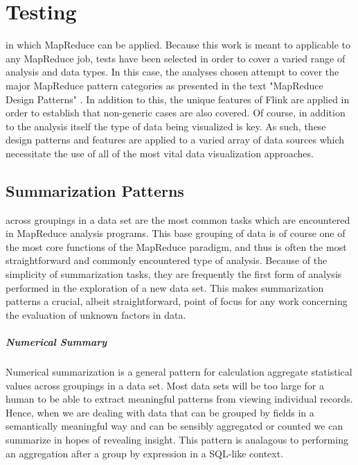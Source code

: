 \chapter{Testing}
\label{sec:testing}
 in which MapReduce can be applied. Because this work is meant to applicable to any MapReduce job, tests have been selected in order to cover a varied range of analysis and data types. In this case, the analyses chosen attempt to cover the major MapReduce pattern categories as presented in the text "MapReduce Design Patterns" \cite{Miner2012}. In addition to this, the unique features of Flink are applied in order to establish that non-generic cases are also covered. Of course, in addition to the analysis itself the type of data being visualized is key. As such, these design patterns and features are applied to a varied array of data sources which necessitate the use of all of the most vital data visualization approaches.

\section{Summarization Patterns}
\label{sec:summarization}
 across groupings in a data set are the most common tasks which are encountered in MapReduce analysis programs. This base grouping of data is of course one of the most core functions of the MapReduce paradigm, and thus is often the most straightforward and commonly encountered type of analysis. Because of the simplicity of summarization tasks, they are frequently the first form of analysis performed in the exploration of a new data set. This makes summarization patterns a crucial, albeit straightforward, point of focus for any work concerning the evaluation of unknown factors in data.

\paragraph{Numerical Summary}
Numerical summarization is a general pattern for calculation aggregate statistical values across groupings in a data set. Most data sets will be too large for a human to be able to extract meaningful patterns from viewing individual records. Hence, when we are dealing with data that can be grouped by fields in a semantically meaningful way and can be sensibly aggregated or counted we can summarize in hopes of revealing insight. This pattern is analagous to performing an aggregation after a group by expression in a SQL-like context.

